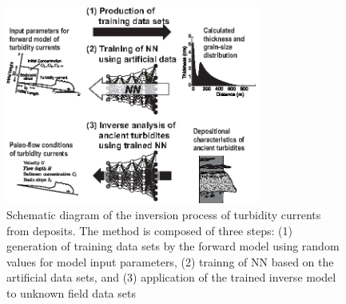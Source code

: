 \begin{figure}[t]
  \includegraphics[width=8.3cm]{fig01.eps}
  \caption{Schematic diagram of the inversion process of turbidity currents from deposits. The method is composed of three steps: (1) generation of training data sets by the forward model using random values for model input parameters, (2) trainng of NN based on the artificial data sets, and (3) application of the trained inverse model to unknown field data sets}
  \label{fig:schematic_diagram_procedures}
\end{figure}

